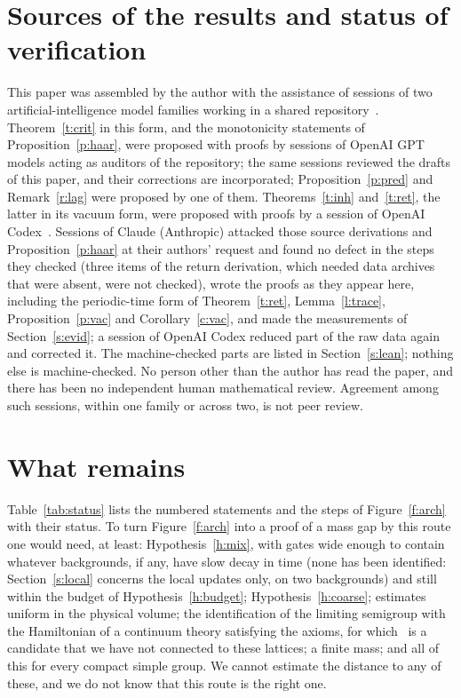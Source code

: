 \section{Sources of the results and status of verification}\label{s:disc}
This paper was assembled by the author with the assistance of sessions of two artificial-intelligence model
families working in a shared repository~\cite{Repo}. Theorem~\ref{t:crit} in this form, and the monotonicity
statements of Proposition~\ref{p:haar}, were proposed with proofs by sessions of OpenAI GPT models acting as
auditors of the repository; the same sessions reviewed the drafts of this paper, and their corrections
are incorporated; Proposition~\ref{p:pred} and Remark~\ref{r:lag} were proposed by one of them. Theorems~\ref{t:inh} and~\ref{t:ret}, the latter in its vacuum form, were proposed with
proofs by a session of OpenAI Codex~\cite{RepoInh,RepoRet}. Sessions of Claude (Anthropic) attacked those
source derivations and Proposition~\ref{p:haar} at their authors' request and found no defect in the steps
they checked (three items of the return derivation, which needed data archives that were absent, were not
checked), wrote the
proofs as they appear here, including the periodic-time form of Theorem~\ref{t:ret}, Lemma~\ref{l:trace}, Proposition~\ref{p:vac} and
Corollary~\ref{c:vac}, and made the measurements of Section~\ref{s:evid}; a session of OpenAI Codex reduced
part of the raw data again and corrected it. The machine-checked parts are listed in
Section~\ref{s:lean}; nothing else is machine-checked. No person other than the author has read the paper, and there has been no independent human
mathematical review. Agreement
among such sessions, within one family or across two, is not peer review.

\section{What remains}\label{s:rem}
Table~\ref{tab:status} lists the numbered statements and the steps of Figure~\ref{f:arch} with their status. To turn Figure~\ref{f:arch} into a proof of a
mass gap by this route one would need, at least: Hypothesis~\ref{h:mix}, with gates wide enough to contain
whatever backgrounds, if any, have slow decay in time (none has been identified: Section~\ref{s:local}
concerns the local updates only, on two backgrounds) and still within the budget of Hypothesis~\ref{h:budget};
Hypothesis~\ref{h:coarse}; estimates uniform in the physical volume; the identification of the limiting
semigroup with the Hamiltonian of a continuum theory satisfying the axioms, for which~\cite{OAI} is a
candidate that we have not connected to these lattices; a finite mass; and all of this for every compact
simple group. We cannot estimate the distance to any of these, and we do not know that this route is the
right one.

